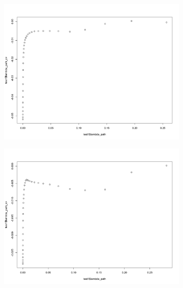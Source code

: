\documentclass[letterpaper]{article}
\begin{document}
\begin{figure}[H]
\centering
\begin{subfigure}{0.5\textwidth}
  \centering
  \includegraphics[width=1\linewidth]{./result_plot/correct/5_path_plot}
\end{subfigure}%
\begin{subfigure}{.5\textwidth}
  \centering
  \includegraphics[width=1\linewidth]{./result_plot/correct/6_path_plot}
\end{subfigure}

\end{figure}
\end{document}
